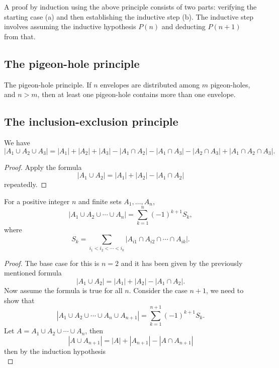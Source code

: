 \documentclass[10pt, a4paper]{article}
\begin{document}
A proof by induction using the above principle consists of two parts:
verifying the starting case (a) and then establishing the inductive step (b).
The inductive step involves assuming the inductive hypothesis $P(n)$ and deducting $P(n + 1)$ from that.

\subsection{The pigeon-hole principle}
The pigeon-hole principle.
If $n$ envelopes are distributed among $m$ pigeon-holes,
and $n > m$,
then at least one pigeon-hole contains more than one envelope.



\subsection{The inclusion-exclusion principle}

\begin{proposition}
    We have
    \[
    |A_1 \cup A_2 \cup A_3| = |A_1| + |A_2| + |A_3| - |A_1 \cap A_2| - |A_1 \cap A_3| - |A_2 \cap A_3| + |A_1 \cap A_2 \cap A_3|.
    \]
    \begin{proof}
        Apply the formula
        \[
        |A_1 \cup A_2| = |A_1| + |A_2| - |A_1 \cap A_2|
        \]
        repeatedly.
    \end{proof}
\end{proposition}

\begin{theorem}
    For a positive integer $n$ and finite sets $A_1, \dotsc, A_n$,
    \[
    |A_1 \cup A_2 \cup \dotsi \cup A_n| = \sum_{k = 1}^{n}(-1) ^ {k + 1}S_k,
    \]
    where
    \[
    S_k = \sum_{i_1 < i_2 < \dotsi < i_k}|A_{i1} \cap A_{i2} \cap \dotsi \cap A_{ik}|.
    \]
    \begin{proof}
        The base case for this is $n = 2$ and it has been given by the previously mentioned formula
        \[
        |A_1 \cup A_2| = |A_1| + |A_2| - |A_1 \cap A_2|.
        \]
        Now assume the formula is true for all $n$.
        Consider the case $n + 1$,
        we need to show that
        \[
        |A_1 \cup A_2 \cup \dotsi \cup A_n \cup A_{n + 1}| = \sum_{k = 1}^{n + 1}(-1) ^ {k + 1}S_k.
        \]
        Let $A = A_1 \cup A_2 \cup \dotsi \cup A_n$, then
        \[
        |A \cup A_{n + 1}| = |A| + |A_{n + 1}| - |A \cap A_{n + 1}|
        \]
        then by the induction hypothesis
        \[
        
        \]
        
    \end{proof}
\end{theorem}
\end{document}
